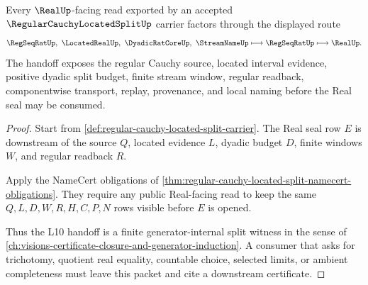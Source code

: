 \begin{theorem}
\label{thm:regular-cauchy-located-split-real-handoff}
Every $\RealUp$-facing read exported by an accepted $\RegularCauchyLocatedSplitUp$ carrier factors through the displayed route
$$
\RegSeqRatUp,\ \LocatedRealUp,\ \DyadicRatCoreUp,\ \StreamNameUp
\longmapsto
\RegSeqRatUp
\longmapsto
\RealUp .
$$
The handoff exposes the regular Cauchy source, located interval evidence, positive dyadic split budget, finite stream window, regular readback, componentwise transport, replay, provenance, and local naming before the Real seal may be consumed.
\end{theorem}
\begin{proof}
Start from \autoref{def:regular-cauchy-located-split-carrier}. The Real seal row $E$ is downstream of the source $Q$, located evidence $L$, dyadic budget $D$, finite windows $W$, and regular readback $R$.

Apply the NameCert obligations of \autoref{thm:regular-cauchy-located-split-namecert-obligations}. They require any public Real-facing read to keep the same $Q,L,D,W,R,H,C,P,N$ rows visible before $E$ is opened.

Thus the L10 handoff is a finite generator-internal split witness in the sense of \autoref{ch:visions-certificate-closure-and-generator-induction}. A consumer that asks for trichotomy, quotient real equality, countable choice, selected limits, or ambient completeness must leave this packet and cite a downstream certificate.
\end{proof}




